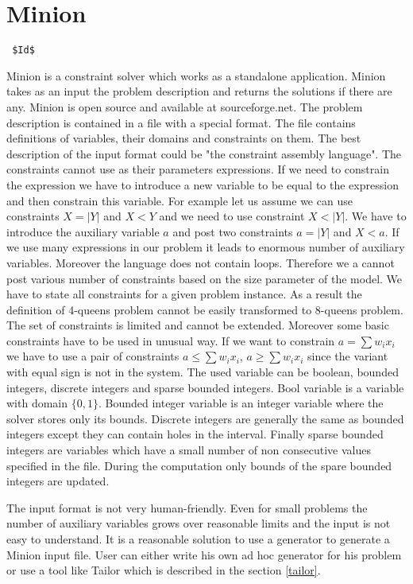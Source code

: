 \section{Minion}
\verb= $Id$ =

Minion is a constraint solver which works as a standalone application. Minion takes
as an input the problem description and returns the solutions if there are any.
Minion is open source and available at sourceforge.net. The problem description
is contained in a file with a special format. The file contains definitions of variables,
their domains and constraints on them. The best description of the input format could
be "the constraint assembly language". The constraints cannot use as their parameters 
expressions. If we need to constrain the expression we have to introduce a new variable
to be equal to the expression and then constrain this variable. For example let us assume 
we can use constraints $X = |Y|$ and $X < Y$ and we need to use constraint $X < |Y|$.
We have to introduce the auxiliary variable $a$ and post two constraints $a = |Y|$ and
 $X < a$. If we use many expressions in our problem it leads to enormous number of
 auxiliary variables. Moreover the language does not contain loops. Therefore we
 a cannot post various number of constraints based on the size parameter of the model.
 We have to state all constraints for a given problem instance. As a result the definition
 of 4-queens problem cannot be easily transformed to 8-queens problem. The set of constraints
 is limited and cannot be extended. Moreover some basic constraints have to be used in unusual way.
 If we want to constrain $a = \sum{w_i x_i}$ we have to use a pair of constraints
 $a \leq \sum{w_i x_i}$, $a \geq \sum{w_i x_i}$ since the variant with equal sign
 is not in the system. The used variable can be boolean, bounded integers, discrete integers
 and sparse bounded integers. Bool variable is a variable with domain $\{0,1\}$.
 Bounded integer variable is an integer variable where the solver stores only its bounds.
 Discrete integers are generally the same as bounded integers except they can contain 
 holes in the interval. Finally sparse bounded integers are variables which have a small
 number of non consecutive values specified in the file. During the computation
 only bounds of the spare bounded integers are updated.  
 
The input format is not very human-friendly. Even for small problems the number of
auxiliary variables grows over reasonable limits and the input is not easy to understand.
It is a reasonable solution to use a generator to generate a Minion input file.
User can either write his own ad hoc generator for his problem or use a tool like
Tailor which is described in the section \ref{tailor}.

